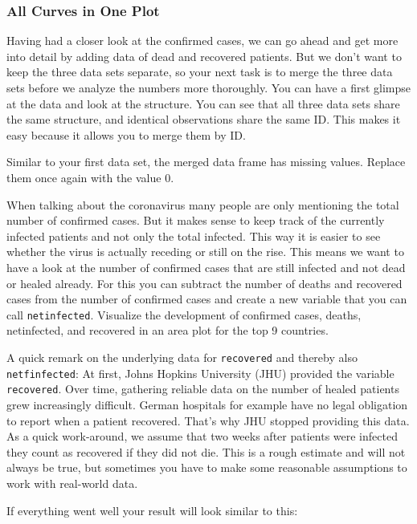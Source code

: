 \documentclass[
  11pt,
]{article}
\begin{document}
\hypertarget{all-curves-in-one-plot}{%
\subsubsection{All Curves in One Plot}\label{all-curves-in-one-plot}}

Having had a closer look at the confirmed cases, we can go ahead and get more into detail by adding data of dead and recovered patients. But we don't want to keep the three data sets separate, so your next task is to merge the three data sets before we analyze the numbers more thoroughly. You can have a first glimpse at the data and look at the structure. You can see that all three data sets share the same structure, and identical observations share the same ID. This makes it easy because it allows you to merge them by ID.

Similar to your first data set, the merged data frame has missing values. Replace them once again with the value 0.

When talking about the coronavirus many people are only mentioning the total number of confirmed cases. But it makes sense to keep track of the currently infected patients and not only the total infected. This way it is easier to see whether the virus is actually receding or still on the rise. This means we want to have a look at the number of confirmed cases that are still infected and not dead or healed already. For this you can subtract the number of deaths and recovered cases from the number of confirmed cases and create a new variable that you can call \texttt{netinfected}. Visualize the development of confirmed cases, deaths, netinfected, and recovered in an area plot for the top 9 countries.

A quick remark on the underlying data for \texttt{recovered} and thereby also \texttt{netfinfected}: At first, Johns Hopkins University (JHU) provided the variable \texttt{recovered}. Over time, gathering reliable data on the number of healed patients grew increasingly difficult.
German hospitals for example have no legal obligation to report when a patient recovered.
That's why JHU stopped providing this data. As a quick work-around, we assume that two weeks after patients were infected they count as recovered if they did not die. This is a rough estimate and will not always be true, but sometimes you have to make some reasonable assumptions to work with real-world data.

If everything went well your result will look similar to this:
\end{document}
